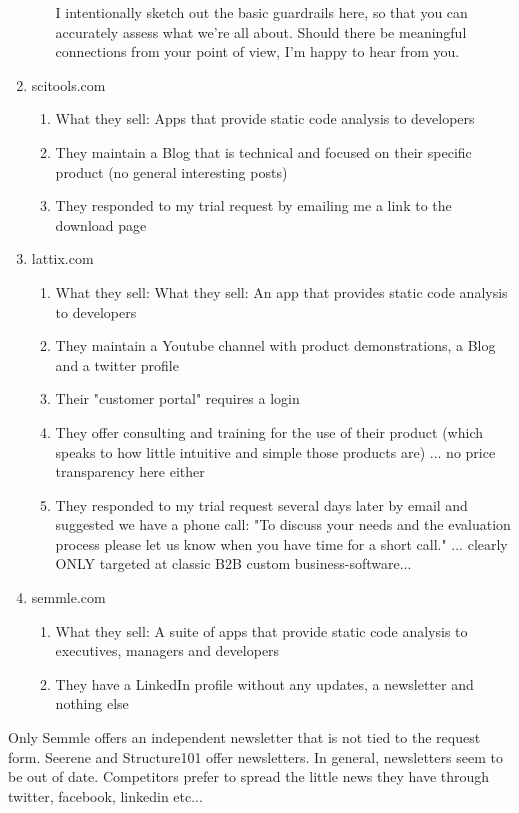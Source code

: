 \documentclass{article}
\begin{document}
\begin{enumerate}
\begin{enumerate}
			I intentionally sketch out the basic guardrails here, so that you can accurately assess what we're all about. Should there be meaningful connections from your point of view, I'm happy to hear from you.
	\end{enumerate}
	\item scitools.com
	\begin{enumerate}
		\item What they sell: Apps that provide static code analysis to developers
		\item They maintain a Blog that is technical and focused on their specific product (no general interesting posts)
		\item They responded to my trial request by emailing me a link to the download page
	\end{enumerate}
	\item lattix.com
	\begin{enumerate}
		\item What they sell: What they sell: An app that provides static code analysis to developers
		\item They maintain a Youtube channel with product demonstrations, a Blog and a twitter profile
		\item Their "customer portal" requires a login
		\item They offer consulting and training for the use of their product (which speaks to how little intuitive and simple those products are) ... no price transparency here either
		\item They responded to my trial request several days later by email and suggested we have a phone call: "To discuss your needs and the evaluation process please let us know when you have time for a short call." ... clearly ONLY targeted at classic B2B custom business-software...
	\end{enumerate}
	\item semmle.com
	\begin{enumerate}
		\item What they sell: A suite of apps that provide static code analysis to executives, managers and developers
		\item They have a LinkedIn profile without any updates, a newsletter and nothing else
	\end{enumerate}
\end{enumerate}

Only Semmle offers an independent newsletter that is not tied to the request form. Seerene and Structure101 offer newsletters. In general, newsletters seem to be out of date. Competitors prefer to spread the little news they have through twitter, facebook, linkedin etc...
\end{document}

